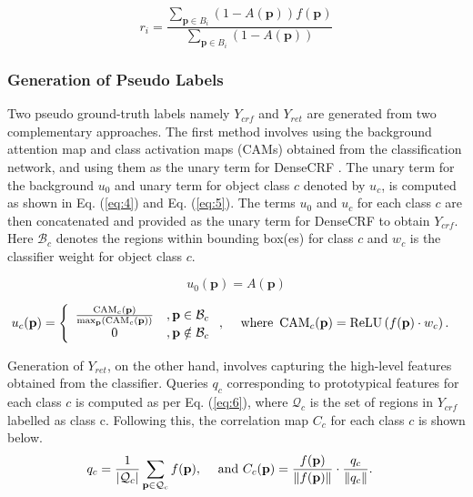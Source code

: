 \begin{equation} \label{eq:3}
r_{i}=\frac{\sum_{\mathbf{p} \in B_{i}}(1-A(\mathbf{p})) f(\mathbf{p})}{\sum_{\mathbf{p} \in B_{i}}(1-A(\mathbf{p}))}
\end{equation}


\subsubsection{Generation of Pseudo Labels}
\label{section3.1.2}
Two pseudo ground-truth labels namely $Y_{crf}$ and $Y_{ret}$ are generated from two complementary approaches. The first method involves using the background attention map and class activation maps (CAMs) \cite{zhou2016learning} obtained from the classification network, and using them as the unary term for DenseCRF \cite{huang2018weakly,kolesnikov2016seed,saleh2016built,zhang2020reliability}. The unary term for the background $u_0$ and  unary term for object class $c$ denoted by $u_c$, is computed as shown in Eq. (\ref{eq:4}) and Eq. (\ref{eq:5}). The terms $u_0$ and $u_c$ for each class $c$ are then concatenated and provided as the unary term for DenseCRF to obtain $Y_{crf}$. Here $\mathcal{B}_c$ denotes the regions within bounding box(es) for class $c$ and $w_c$ is the classifier weight for object class $c$.

\begin{equation} \label{eq:4}
u_{0}(\mathbf{p})=A(\mathbf{p})
\end{equation}

\begin{align}
\label{eq:5}
	u_{c}(\mathbf{p})=\left\{\begin{array}{cl}
    \frac{\operatorname{CAM}_{c}(\mathbf{p})}{\max _{\mathbf{p}}\left(\operatorname{CAM}_{c}(\mathbf{p})\right)} & , \mathbf{p} \in \mathcal{B}_{c} \\
    0 & , \mathbf{p} \notin \mathcal{B}_{c}
    \end{array}\right.,
	& \text{\hspace{0.5cm}where } \operatorname{CAM}_{c}(\mathbf{p})=\operatorname{ReLU}\left(f(\mathbf{p}) \cdot w_{c}\right).
\end{align}


Generation of $Y_{ret}$, on the other hand, involves capturing the high-level features obtained from the classifier. Queries $q_c$ corresponding to prototypical features for each class $c$ is computed as per Eq. (\ref{eq:6}), where $\mathcal{Q}_{c}$ is the set of regions in $Y_{crf}$ labelled as class c. Following this, the correlation map $C_c$ for each class $c$ is shown below.
\begin{align}
\label{eq:6}
    q_{c}=\frac{1}{\left|\mathcal{Q}_{c}\right|} \sum_{\mathbf{p} \in \mathcal{Q}_{c}} f(\mathbf{p}),
	& \text{\hspace{0.5cm}and  } C_{c}(\mathbf{p})=\frac{f(\mathbf{p})}{\|f(\mathbf{p})\|} \cdot \frac{q_{c}}{\left\|q_{c}\right\|}.
\end{align}

